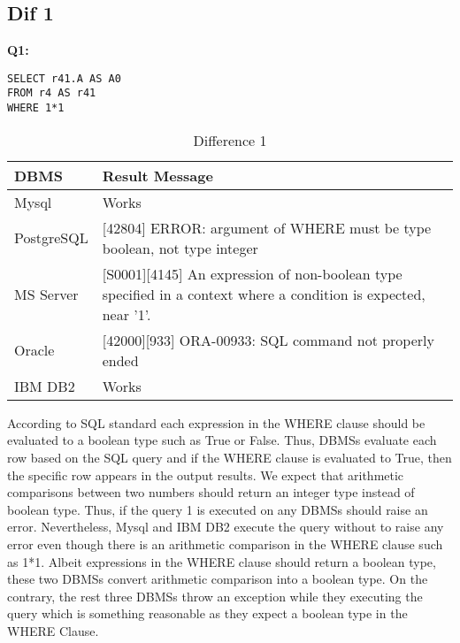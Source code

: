 \subsection{Dif 1}

\textbf{Q1:}
\begin{mdframed}[nobreak=true, backgroundcolor=lightgray!20] 
\begin{lstlisting}[style=SQL]
SELECT r41.A AS A0
FROM r4 AS r41
WHERE 1*1
\end{lstlisting}
\end{mdframed}

\begin{table}[h]
\centering
\caption{Difference 1}
\begin{tabular}{|p{2cm}|p{11.5cm}| }
\hline
\textbf{DBMS} & \textbf{Result Message}                                                                                                 \\ \hline
Mysql         & Works                                                                                                                   \\ \hline
PostgreSQL    & {[}42804{]} ERROR: argument of WHERE must be type boolean, not type integer                                             \\ \hline
MS Server     & {[}S0001{]}{[}4145{]} An expression of non-boolean type specified in a context where a condition is expected, near '1'. \\ \hline
Oracle        & {[}42000{]}{[}933{]} ORA-00933: SQL command not properly ended                                                          \\ \hline
IBM DB2       & Works                                                                                                                   \\ \hline
\end{tabular}
\end{table}

According to SQL standard each expression in the WHERE clause should be evaluated to a boolean type such as True or False. Thus, DBMSs evaluate each row based on the SQL query and if the WHERE clause is evaluated to True, then the specific row appears in the output results. We expect that arithmetic comparisons between two numbers should return an integer type instead of boolean type. Thus, if the query 1 is executed on any DBMSs should raise an error. Nevertheless, Mysql and IBM DB2 execute the query without to raise any error even though there is an arithmetic comparison  in the WHERE clause such as 1*1. Albeit expressions in the WHERE clause should return a boolean type, these two DBMSs convert arithmetic comparison into a boolean type. On the contrary, the rest three DBMSs throw an exception while they executing the query which is something reasonable as they expect a boolean type in the WHERE Clause. 

